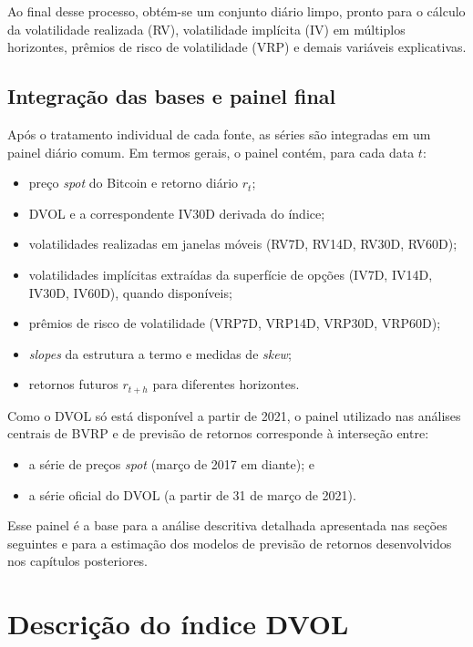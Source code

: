 Ao final desse processo, obtém-se um conjunto diário limpo, pronto para o cálculo
da volatilidade realizada (RV), volatilidade implícita (IV) em múltiplos horizontes,
prêmios de risco de volatilidade (VRP) e demais variáveis explicativas.

\subsection{Integração das bases e painel final}

Após o tratamento individual de cada fonte, as séries são integradas em um painel
diário comum. Em termos gerais, o painel contém, para cada data $t$:

\begin{itemize}
    \item preço \textit{spot} do Bitcoin e retorno diário $r_t$;
    \item DVOL e a correspondente IV30D derivada do índice;
    \item volatilidades realizadas em janelas móveis (RV7D, RV14D, RV30D, RV60D);
    \item volatilidades implícitas extraídas da superfície de opções (IV7D, IV14D,
    IV30D, IV60D), quando disponíveis;
    \item prêmios de risco de volatilidade (VRP7D, VRP14D, VRP30D, VRP60D);
    \item \textit{slopes} da estrutura a termo e medidas de \textit{skew};
    \item retornos futuros $r_{t+h}$ para diferentes horizontes.
\end{itemize}

Como o DVOL só está disponível a partir de 2021, o painel utilizado nas análises
centrais de BVRP e de previsão de retornos corresponde à interseção entre:

\begin{itemize}
    \item a série de preços \textit{spot} (março de 2017 em diante); e
    \item a série oficial do DVOL (a partir de 31 de março de 2021).
\end{itemize}

Esse painel é a base para a análise descritiva detalhada apresentada nas seções
seguintes e para a estimação dos modelos de previsão de retornos desenvolvidos
nos capítulos posteriores.


\section{Descrição do índice DVOL}
\label{sec:dvol}


